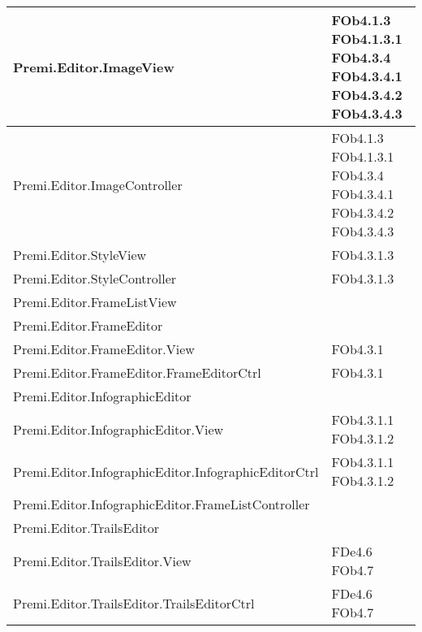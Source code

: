\begin{longtable}{|p{10cm}|p{4cm}|}
\hline
Premi.Editor.ImageView & FOb4.1.3 \linebreak FOb4.1.3.1 \linebreak FOb4.3.4 \linebreak FOb4.3.4.1 \linebreak FOb4.3.4.2 \linebreak FOb4.3.4.3 \linebreak \\
\hline
Premi.Editor.ImageController & FOb4.1.3 \linebreak FOb4.1.3.1 \linebreak FOb4.3.4 \linebreak FOb4.3.4.1 \linebreak FOb4.3.4.2 \linebreak FOb4.3.4.3 \linebreak \\
\hline
Premi.Editor.StyleView & FOb4.3.1.3 \linebreak \\
\hline
Premi.Editor.StyleController & FOb4.3.1.3 \linebreak \\
\hline
Premi.Editor.FrameListView & \\
\hline
Premi.Editor.FrameEditor & \\
\hline
Premi.Editor.FrameEditor.View & FOb4.3.1 \linebreak \\
\hline
Premi.Editor.FrameEditor.FrameEditorCtrl & FOb4.3.1 \linebreak \\
\hline
Premi.Editor.InfographicEditor & \\
\hline
Premi.Editor.InfographicEditor.View & FOb4.3.1.1 \linebreak FOb4.3.1.2 \linebreak \\
\hline
Premi.Editor.InfographicEditor.InfographicEditorCtrl & FOb4.3.1.1 \linebreak FOb4.3.1.2 \linebreak \\
\hline
Premi.Editor.InfographicEditor.FrameListController & \\
\hline
Premi.Editor.TrailsEditor & \\
\hline
Premi.Editor.TrailsEditor.View & FDe4.6 \linebreak FOb4.7 \linebreak \\
\hline
Premi.Editor.TrailsEditor.TrailsEditorCtrl & FDe4.6 \linebreak FOb4.7 \linebreak \\

\end{longtable}
